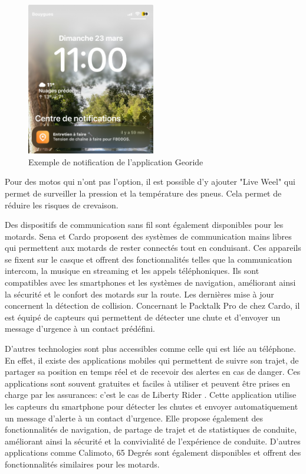 \documentclass{article}
\begin{document}
\begin{figure}[H]
    \centering
    \includegraphics[width=0.5\textwidth]{images/notification_georide.jpg} 
    \caption{Exemple de notification de l'application Georide}
\end{figure}
Pour des motos qui n'ont pas l'option, il est possible d'y ajouter "Live Weel" qui permet de surveiller la pression et la température des pneus. Cela permet de réduire les risques de crevaison.
\vspace{0.5cm}

Des dispositifs de communication sans fil sont également disponibles pour les motards. Sena et Cardo\cite{cardo} proposent des systèmes de communication mains libres qui permettent aux motards de rester connectés tout en conduisant. Ces appareils se fixent sur le casque et offrent des fonctionnalités telles que la communication intercom, la musique en streaming et les appels téléphoniques. Ils sont compatibles avec les smartphones et les systèmes de navigation, améliorant ainsi la sécurité et le confort des motards sur la route. Les dernières mise à jour concernent la détection de collision. Concernant le Packtalk Pro de chez Cardo, il est équipé de capteurs qui permettent de détecter une chute et d'envoyer un message d'urgence à un contact prédéfini.

D'autres technologies sont plus accessibles comme celle qui est liée au téléphone. En effet, il existe des applications mobiles qui permettent de suivre son trajet, de partager sa position en temps réel et de recevoir des alertes en cas de danger. Ces applications sont souvent gratuites et faciles à utiliser et peuvent être prises en charge par les assurances: c'est le cas de Liberty Rider \cite{liberty_rider}. Cette application utilise les capteurs du smartphone pour détecter les chutes et envoyer automatiquement un message d'alerte à un contact d’urgence. Elle propose également des fonctionnalités de navigation, de partage de trajet et de statistiques de conduite, améliorant ainsi la sécurité et la convivialité de l’expérience de conduite. D'autres applications comme Calimoto, 65 Degrés sont également disponibles et offrent des fonctionnalités similaires pour les motards.
\end{document}
